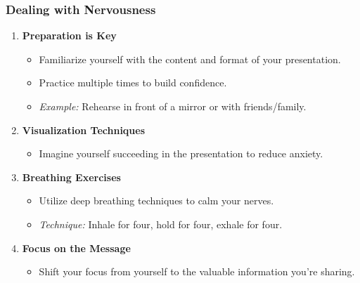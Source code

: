 \documentclass{beamer}
\begin{document}
\begin{frame}[fragile]
    \frametitle{Dealing with Nervousness}
    \begin{enumerate}
        \item \textbf{Preparation is Key}
        \begin{itemize}
            \item Familiarize yourself with the content and format of your presentation.
            \item Practice multiple times to build confidence.
            \item \textit{Example:} Rehearse in front of a mirror or with friends/family.
        \end{itemize}

        \item \textbf{Visualization Techniques}
        \begin{itemize}
            \item Imagine yourself succeeding in the presentation to reduce anxiety.
        \end{itemize}

        \item \textbf{Breathing Exercises}
        \begin{itemize}
            \item Utilize deep breathing techniques to calm your nerves.
            \item \textit{Technique:} Inhale for four, hold for four, exhale for four.
        \end{itemize}

        \item \textbf{Focus on the Message}
        \begin{itemize}
            \item Shift your focus from yourself to the valuable information you're sharing.
        \end{itemize}
    \end{enumerate}
\end{frame}
\end{document}
